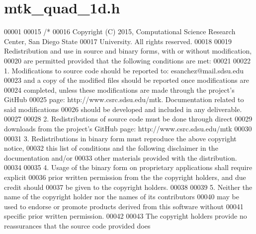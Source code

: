 \hypertarget{mtk__quad__1d_8h_source}{\section{mtk\+\_\+quad\+\_\+1d.\+h}
\label{mtk__quad__1d_8h_source}
}

\begin{DoxyCode}
00001 
00015 \textcolor{comment}{/*}
00016 \textcolor{comment}{Copyright (C) 2015, Computational Science Research Center, San Diego State}
00017 \textcolor{comment}{University. All rights reserved.}
00018 \textcolor{comment}{}
00019 \textcolor{comment}{Redistribution and use in source and binary forms, with or without modification,}
00020 \textcolor{comment}{are permitted provided that the following conditions are met:}
00021 \textcolor{comment}{}
00022 \textcolor{comment}{1. Modifications to source code should be reported to: esanchez@mail.sdsu.edu}
00023 \textcolor{comment}{and a copy of the modified files should be reported once modifications are}
00024 \textcolor{comment}{completed, unless these modifications are made through the project's GitHub}
00025 \textcolor{comment}{page: http://www.csrc.sdsu.edu/mtk. Documentation related to said modifications}
00026 \textcolor{comment}{should be developed and included in any deliverable.}
00027 \textcolor{comment}{}
00028 \textcolor{comment}{2. Redistributions of source code must be done through direct}
00029 \textcolor{comment}{downloads from the project's GitHub page: http://www.csrc.sdsu.edu/mtk}
00030 \textcolor{comment}{}
00031 \textcolor{comment}{3. Redistributions in binary form must reproduce the above copyright notice,}
00032 \textcolor{comment}{this list of conditions and the following disclaimer in the documentation and/or}
00033 \textcolor{comment}{other materials provided with the distribution.}
00034 \textcolor{comment}{}
00035 \textcolor{comment}{4. Usage of the binary form on proprietary applications shall require explicit}
00036 \textcolor{comment}{prior written permission from the the copyright holders, and due credit should}
00037 \textcolor{comment}{be given to the copyright holders.}
00038 \textcolor{comment}{}
00039 \textcolor{comment}{5. Neither the name of the copyright holder nor the names of its contributors}
00040 \textcolor{comment}{may be used to endorse or promote products derived from this software without}
00041 \textcolor{comment}{specific prior written permission.}
00042 \textcolor{comment}{}
00043 \textcolor{comment}{The copyright holders provide no reassurances that the source code provided does}

\end{DoxyCode}
